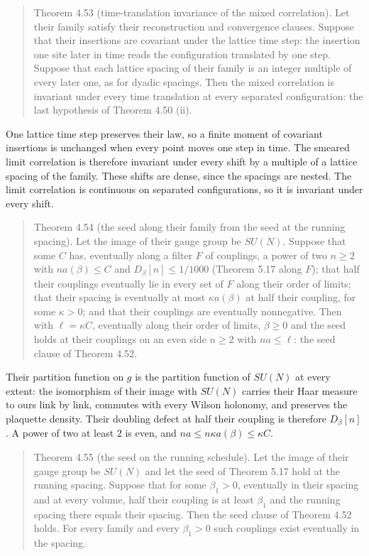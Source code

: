 \documentclass[10pt,letterpaper,twocolumn]{article}
\begin{document}
\begin{quote}
Theorem 4.53 (time-translation invariance of the mixed correlation). Let their family satisfy their reconstruction and convergence clauses. Suppose that their insertions are covariant under the lattice time step: the insertion one site later in time reads the configuration translated by one step. Suppose that each lattice spacing of their family is an integer multiple of every later one, as for dyadic spacings. Then the mixed correlation is invariant under every time translation at every separated configuration: the last hypothesis of Theorem 4.50 (ii).
\end{quote}

One lattice time step preserves their law, so a finite moment of covariant insertions is unchanged when every point moves one step in time. The smeared limit correlation is therefore invariant under every shift by a multiple of a lattice spacing of the family. These shifts are dense, since the spacings are nested. The limit correlation is continuous on separated configurations, so it is invariant under every shift.

\begin{quote}
Theorem 4.54 (the seed along their family from the seed at the running spacing). Let the image of their gauge group be \(SU(N)\). Suppose that some \(C\) has, eventually along a filter \(F\) of couplings, a power of two \(n\ge2\) with \(na(\beta)\le C\) and \(D_\beta[n]\le1/1000\) (Theorem 5.17 along \(F\)); that half their couplings eventually lie in every set of \(F\) along their order of limits; that their spacing is eventually at most \(\kappa a(\beta)\) at half their coupling, for some \(\kappa>0\); and that their couplings are eventually nonnegative. Then with \(\ell=\kappa C\), eventually along their order of limits, \(\beta\ge0\) and the seed holds at their couplings on an even side \(n\ge2\) with \(na\le\ell\): the seed clause of Theorem 4.52.
\end{quote}

Their partition function on \(g\) is the partition function of \(SU(N)\) at every extent: the isomorphism of their image with \(SU(N)\) carries their Haar measure to ours link by link, commutes with every Wilson holonomy, and preserves the plaquette density. Their doubling defect at half their coupling is therefore \(D_\beta[n]\). A power of two at least \(2\) is even, and \(na\le n\kappa a(\beta)\le\kappa C\).

\begin{quote}
Theorem 4.55 (the seed on the running schedule). Let the image of their gauge group be \(SU(N)\) and let the seed of Theorem 5.17 hold at the running spacing. Suppose that for some \(\beta_1>0\), eventually in their spacing and at every volume, half their coupling is at least \(\beta_1\) and the running spacing there equals their spacing. Then the seed clause of Theorem 4.52 holds. For every family and every \(\beta_1>0\) such couplings exist eventually in the spacing.
\end{quote}
\end{document}
